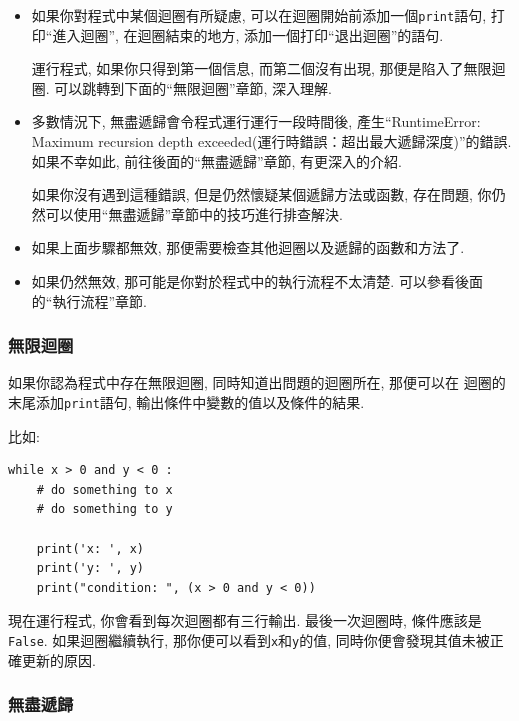 \documentclass[10pt]{book}
\begin{document}
\begin{itemize}

\item 如果你對程式中某個迴圈有所疑慮, 可以在迴圈開始前添加一個{\tt print}語句, 
打印``進入迴圈'', 在迴圈結束的地方, 添加一個打印``退出迴圈''的語句. 

運行程式, 如果你只得到第一個信息, 而第二個沒有出現, 
那便是陷入了無限迴圈. 可以跳轉到下面的``無限迴圈''章節, 深入理解. 

\item 多數情況下, 無盡遞歸會令程式運行運行一段時間後, 產生``RuntimeError: Maximum
recursion depth exceeded(運行時錯誤：超出最大遞歸深度)''的錯誤. 
如果不幸如此, 前往後面的``無盡遞歸''章節, 有更深入的介紹. 

如果你沒有遇到這種錯誤, 但是仍然懷疑某個遞歸方法或函數, 存在問題, 
你仍然可以使用``無盡遞歸''章節中的技巧進行排查解決. 

\item 如果上面步驟都無效, 那便需要檢查其他迴圈以及遞歸的函數和方法了. 

\item 如果仍然無效, 那可能是你對於程式中的執行流程不太清楚. 
可以參看後面的``執行流程''章節. 
\end{itemize}


\subsubsection{無限迴圈}

如果你認為程式中存在無限迴圈, 同時知道出問題的迴圈所在, 那便可以在
迴圈的末尾添加{\tt print}語句, 輸出條件中變數的值以及條件的結果. 

比如:

\begin{verbatim}
while x > 0 and y < 0 :
    # do something to x
    # do something to y

    print('x: ', x)
    print('y: ', y)
    print("condition: ", (x > 0 and y < 0))
\end{verbatim}
%
現在運行程式, 你會看到每次迴圈都有三行輸出. 
最後一次迴圈時, 條件應該是{\tt False}.
如果迴圈繼續執行, 那你便可以看到{\tt x}和{\tt y}的值, 
同時你便會發現其值未被正確更新的原因.


\subsubsection{無盡遞歸}
\end{document}
